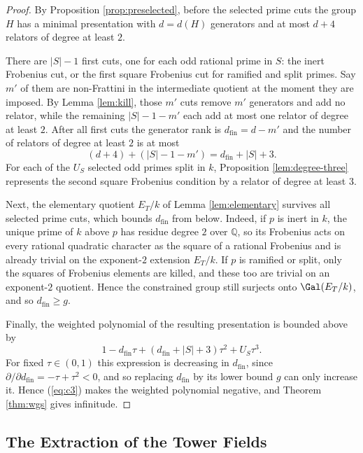 \begin{proof}
By Proposition \ref{prop:preselected}, before the selected prime cuts the group $H$ has a minimal presentation with $d=d(H)$ generators and at most $d+4$ relators of degree at least $2$.

There are $|S|-1$ first cuts, one for each odd rational prime in $S$: the inert Frobenius cut, or the first square Frobenius cut for ramified and split primes.  Say $m'$ of them are non-Frattini in the intermediate quotient at the moment they are imposed.  By Lemma \ref{lem:kill}, those $m'$ cuts remove $m'$ generators and add no relator, while the remaining $|S|-1-m'$ each add at most one relator of degree at least $2$.  After all first cuts the generator rank is $d_{\mathrm{fin}}=d-m'$ and the number of relators of degree at least $2$ is at most
\[
   (d+4)+(|S|-1-m')=d_{\mathrm{fin}}+|S|+3.
\]
For each of the $U_S$ selected odd primes split in $k$, Proposition \ref{lem:degree-three} represents the second square Frobenius condition by a relator of degree at least $3$.

Next, the elementary quotient $E_T/k$ of Lemma \ref{lem:elementary} survives all selected prime cuts, which bounds $d_{\mathrm{fin}}$ from below.  Indeed, if $p$ is inert in $k$, the unique prime of $k$ above $p$ has residue degree $2$ over $\mathbb{Q}$, so its Frobenius acts on every rational quadratic character as the square of a rational Frobenius and is already trivial on the exponent-$2$ extension $E_T/k$.  If $p$ is ramified or split, only the squares of Frobenius elements are killed, and these too are trivial on an exponent-$2$ quotient.  Hence the constrained group still surjects onto $\Gal(E_T/k)$, and so $d_{\mathrm{fin}}\geq g$.

Finally, the weighted polynomial of the resulting presentation is bounded above by
\[
   1-d_{\mathrm{fin}}\tau+(d_{\mathrm{fin}}+|S|+3)\tau^2+U_S\tau^3.
\]
For fixed $\tau\in(0,1)$ this expression is decreasing in $d_{\mathrm{fin}}$, since $\partial/\partial d_{\mathrm{fin}}=-\tau+\tau^2<0$, and so replacing $d_{\mathrm{fin}}$ by its lower bound $g$ can only increase it.  Hence (\ref{eq:c3}) makes the weighted polynomial negative, and Theorem \ref{thm:wgs} gives infinitude.
\end{proof}

\subsection{The Extraction of the Tower Fields}

